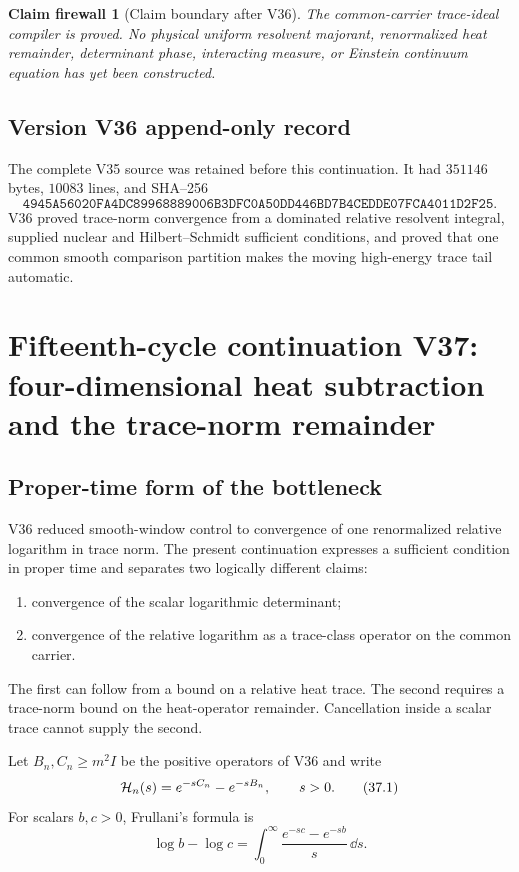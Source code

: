 \documentclass[11pt]{article}
\newtheorem{firewall}[theorem]{Claim firewall}
\theoremstyle{remark}
\begin{document}
\begin{firewall}[Claim boundary after V36]
\label{fire:v15v36}
The common-carrier trace-ideal compiler is proved.  No physical
uniform resolvent majorant, renormalized heat remainder, determinant
phase, interacting measure, or Einstein continuum equation has yet
been constructed.
\end{firewall}

\section*{Version V36 append-only record}
The complete V35 source was retained before this continuation.  It
had \(351146\) bytes, \(10083\) lines, and SHA--256
\[
 \texttt{4945A56020FA4DC89968889006B3DFC0A50DD446BD7B4CEDDE07FCA4011D2F25}.
\]
V36 proved trace-norm convergence from a dominated relative
resolvent integral, supplied nuclear and Hilbert--Schmidt sufficient
conditions, and proved that one common smooth comparison partition
makes the moving high-energy trace tail automatic.

\chapter{Fifteenth-cycle continuation V37: four-dimensional heat subtraction and the trace-norm remainder}
\label{sec:v15v37}

\section{Proper-time form of the bottleneck}

V36 reduced smooth-window control to convergence of one
renormalized relative logarithm in trace norm.  The present
continuation expresses a sufficient condition in proper time and
separates two logically different claims:
\begin{enumerate}
\item convergence of the scalar logarithmic determinant;
\item convergence of the relative logarithm as a trace-class
      operator on the common carrier.
\end{enumerate}
The first can follow from a bound on a relative heat trace.  The
second requires a trace-norm bound on the heat-operator remainder.
Cancellation inside a scalar trace cannot supply the second.

Let \(B_n,C_n\geq m^2I\) be the positive operators of V36 and write
\[
 {\cal H}_n(s)=e^{-sC_n}-e^{-sB_n},\qquad s>0.            \tag{37.1}
\]
For scalars \(b,c>0\), Frullani's formula is
\[
 \log b-\log c
 =\int_0^\infty\frac{e^{-sc}-e^{-sb}}s\,\dd s.           \tag{37.2}
\]
\end{document}
